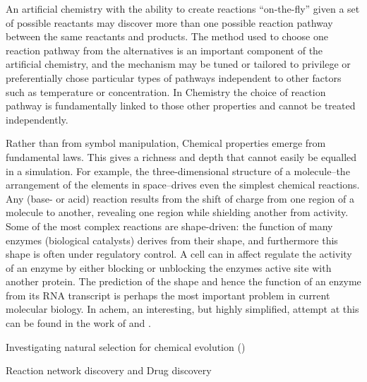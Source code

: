 An artificial chemistry with the ability to create reactions
``on-the-fly'' given a set of possible reactants may discover more than
one possible reaction pathway between the same reactants and products.
The method used to choose one reaction pathway from the alternatives is
an important component of the artificial chemistry, and the mechanism
may be tuned or tailored to privilege or preferentially chose particular
types of pathways independent to other factors such as temperature or
concentration. In Chemistry the choice of reaction pathway is
fundamentally linked to those other properties and cannot be treated
independently.

Rather than from symbol manipulation, Chemical properties emerge from
fundamental laws. This gives a richness and depth that cannot easily be
equalled in a simulation. For example, the three-dimensional structure
of a molecule--the arrangement of the elements in space--drives even
the simplest chemical reactions. Any (base- or acid) reaction results
from the shift of charge from one region of a molecule to another,
revealing one region while shielding another from activity. Some of the
most complex reactions are shape-driven: the function of many enzymes
(biological catalysts) derives from their shape, and furthermore this
shape is often under regulatory control. A cell can in affect regulate
the activity of an enzyme by either blocking or unblocking the enzymes
active site with another protein. The prediction of the shape and hence
the function of an enzyme from its RNA transcript is perhaps the most
important problem in current molecular biology. In \gls{achem}, an
interesting, but highly simplified, attempt at this can be found in the
work of \autocite{Flamm2010} and \autocite{Ullrich2010}.

Investigating natural selection for chemical evolution
(\eg \autocite{Fernando:2007pf})

Reaction network discovery and Drug discovery

